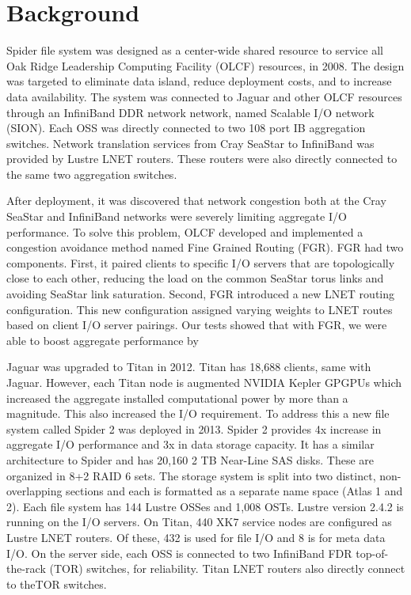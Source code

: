 \section{Background}

Spider file system was designed as a center-wide shared resource to service all
Oak Ridge Leadership Computing Facility (OLCF) resources, in 2008. The design
was targeted to eliminate data island, reduce deployment costs, and to increase
data availability. The system was connected to Jaguar and other OLCF resources
through an InfiniBand DDR network network, named Scalable I/O network (SION).
Each OSS was directly connected to two 108 port IB aggregation switches.
Network translation services from Cray SeaStar to InfiniBand was provided by
Lustre LNET routers. These routers were also directly connected to the same two
aggregation switches.    

After deployment, it was discovered that network congestion both at the Cray
SeaStar and InfiniBand networks were severely limiting aggregate I/O
performance. To solve this problem, OLCF developed and implemented a congestion
avoidance method named Fine Grained Routing (FGR). FGR had two components.
First, it paired clients to specific I/O servers that are topologically close
to each other, reducing the load on the common SeaStar torus links and avoiding
SeaStar link saturation. Second, FGR introduced a new LNET routing
configuration. This new configuration assigned varying weights to LNET routes
based on client I/O server pairings. Our tests showed that with FGR, we were
able to boost aggregate performance by %
 
Jaguar was upgraded to Titan in 2012. Titan has 18,688 clients, same with
Jaguar. However, each Titan node is augmented NVIDIA Kepler GPGPUs which
increased the aggregate installed computational power by more than a magnitude.
This also increased the I/O requirement. To address this a new file system
called Spider 2 was deployed in 2013. Spider 2 provides 4x increase in
aggregate I/O performance and 3x in data storage capacity. It has a similar
architecture to Spider and has 20,160 2 TB Near-Line SAS disks. These are
organized in 8+2 RAID 6 sets. The storage system is split into two distinct,
non-overlapping sections and each is formatted as a separate name space (Atlas
1 and 2). Each file system has 144 Lustre OSSes and 1,008 OSTs. Lustre version
2.4.2 is running on the I/O servers. On Titan, 440 XK7 service nodes are
configured as Lustre LNET routers. Of these, 432 is used for file I/O and 8 is
for meta data I/O.  On the server side, each OSS is connected to two InfiniBand
FDR top-of-the-rack (TOR) switches, for reliability. Titan LNET routers also
directly connect to theTOR switches.   

 

